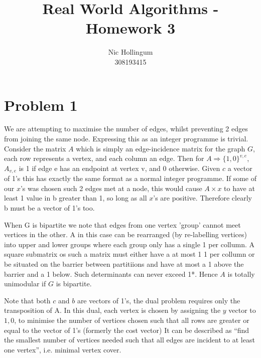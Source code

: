 
\author{	Nic Hollingum\\
			308193415}
\title{Real World Algorithms - Homework 3}

\addtolength{\oddsidemargin}{-.875in}
\addtolength{\evensidemargin}{-.875in}
\addtolength{\textwidth}{1.75in}
\addtolength{\topmargin}{-1.875in}
\addtolength{\textheight}{2.75in}


\maketitle

\section {Problem 1}
We are attempting to maximise the number of edges, whilst preventing 2 edges from joining the same node.
Expressing this as an integer programme is trivial.
Consider the matrix $A$ which is simply an edge-incidence matrix for the graph $G$, each row represents a vertex, and each column an edge.
Then for $A \Rightarrow \{ 1, 0\}^{v, e}$, $A_{v, e}$ is 1 if edge e has an endpoint at vertex v, and 0 otherwise.
Given $c$ a vector of 1's this has exactly the same format as a normal integer programme.
If some of our $x$'s was chosen such 2 edges met at a node, this would cause $A \times x$ to have at least 1 value in b greater than 1, so long as all $x$'s are positive.
Therefore clearly b must be a vector of 1's too.

When G is bipartite we note that edges from one vertex 'group' cannot meet vertices in the other.
A in this case can be rearranged (by re-labelling vertices) into upper and lower groups where each group only has a single 1 per collumn.
A square submatrix os such a matrix must either have a at most 1 1 per collumn or be situated on the barrier between partitiions and have at most a 1 above the barrier and a 1 below.
Such determinants can never exceed 1*.
Hence $A$ is totally unimodular if $G$ is bipartite.

Note that both $c$ and $b$ are vectors of 1's, the dual problem requires only the transposition of A.
In this dual, each vertex is chosen by assigning the $y$ vector to ${1, 0}$, to minimise the number of vertices chosen such that all rows are greater or equal to the vector of 1's (formerly the cost vector)
It can be described as ``find the smallest number of vertices needed such that all edges are incident to at least one vertex'', i.e. minimal vertex cover.

